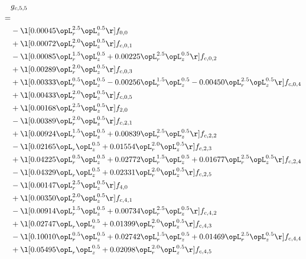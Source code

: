 \begin{alignat}{2} 
\label{eq:g_55_0} 
& g_{c,5,5} \nonumber \\ 
 = \\ 
& - \l[  0.00045 \opL_r^{2.5} \opL_z^{0.5}  \r] f_{0,0} \nonumber \\ 
& + \l[  0.00072 \opL_r^{2.0} \opL_z^{0.5}  \r] f_{c,0,1} \nonumber \\ 
& - \l[  0.00085 \opL_r^{1.5} \opL_z^{0.5} +  0.00225 \opL_r^{2.5} \opL_z^{0.5}  \r] f_{c,0,2} \nonumber \\ 
& + \l[  0.00289 \opL_r^{2.0} \opL_z^{0.5}  \r] f_{c,0,3} \nonumber \\ 
& + \l[  0.00333 \opL_r^{0.5} \opL_z^{0.5}   -0.00256 \opL_r^{1.5} \opL_z^{0.5}   -0.00450 \opL_r^{2.5} \opL_z^{0.5}  \r] f_{c,0,4} \nonumber \\ 
& + \l[  0.00433 \opL_r^{2.0} \opL_z^{0.5}  \r] f_{c,0,5} \nonumber \\ 
& + \l[  0.00168 \opL_r^{2.5} \opL_z^{0.5}  \r] f_{2,0} \nonumber \\ 
& - \l[  0.00389 \opL_r^{2.0} \opL_z^{0.5}  \r] f_{c,2,1} \nonumber \\ 
& + \l[  0.00924 \opL_r^{1.5} \opL_z^{0.5} +  0.00839 \opL_r^{2.5} \opL_z^{0.5}  \r] f_{c,2,2} \nonumber \\ 
& - \l[  0.02165 \opL_r \opL_z^{0.5} +  0.01554 \opL_r^{2.0} \opL_z^{0.5}  \r] f_{c,2,3} \nonumber \\ 
& + \l[  0.04225 \opL_r^{0.5} \opL_z^{0.5} +  0.02772 \opL_r^{1.5} \opL_z^{0.5} +  0.01677 \opL_r^{2.5} \opL_z^{0.5}  \r] f_{c,2,4} \nonumber \\ 
& - \l[  0.04329 \opL_r \opL_z^{0.5} +  0.02331 \opL_r^{2.0} \opL_z^{0.5}  \r] f_{c,2,5} \nonumber \\ 
& - \l[  0.00147 \opL_r^{2.5} \opL_z^{0.5}  \r] f_{4,0} \nonumber \\ 
& + \l[  0.00350 \opL_r^{2.0} \opL_z^{0.5}  \r] f_{c,4,1} \nonumber \\ 
& - \l[  0.00914 \opL_r^{1.5} \opL_z^{0.5} +  0.00734 \opL_r^{2.5} \opL_z^{0.5}  \r] f_{c,4,2} \nonumber \\ 
& + \l[  0.02747 \opL_r \opL_z^{0.5} +  0.01399 \opL_r^{2.0} \opL_z^{0.5}  \r] f_{c,4,3} \nonumber \\ 
& - \l[  0.10010 \opL_r^{0.5} \opL_z^{0.5} +  0.02742 \opL_r^{1.5} \opL_z^{0.5} +  0.01469 \opL_r^{2.5} \opL_z^{0.5}  \r] f_{c,4,4} \nonumber \\ 
& + \l[  0.05495 \opL_r \opL_z^{0.5} +  0.02098 \opL_r^{2.0} \opL_z^{0.5}  \r] f_{c,4,5} \nonumber \\ 
\end{alignat} 


